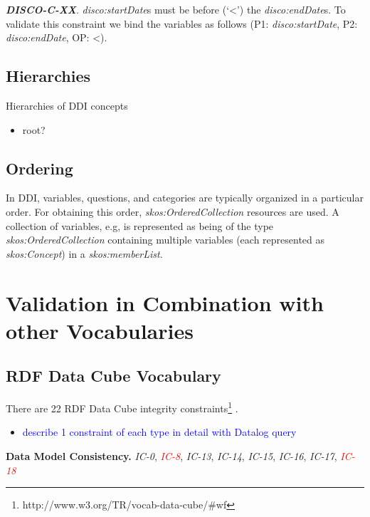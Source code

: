 \documentclass{elsart3p}    %
\begin{document}
\textbf{{\em DISCO-C-XX}}.
{\em disco:startDate}s must be before (‘\textless’) the {\em disco:endDate}s.
To validate this constraint we bind the variables as follows (P1: {\em disco:startDate}, P2: {\em disco:endDate}, OP: \textless). 

\subsection{Hierarchies}

Hierarchies of DDI concepts

\begin{itemize}
	\item root?
\end{itemize}

\subsection{Ordering}

In DDI, variables, questions, and categories are typically organized in a particular order. 
For obtaining this order, {\em skos:OrderedCollection} resources are used. 
A collection of variables, e.g, is represented as being of the type {\em skos:OrderedCollection} containing multiple variables (each represented as {\em skos:Concept}) in a {\em skos:memberList}. 

\section{Validation in Combination with other Vocabularies}

\subsection{RDF Data Cube Vocabulary}

There are 22 RDF Data Cube integrity constraints\footnote{http://www.w3.org/TR/vocab-data-cube/\#wf} \cite{CyganiakReynolds2014}.

\begin{itemize}
	\item \textcolor{blue}{describe 1 constraint of each type in detail with Datalog query}
\end{itemize}

\textbf{Data Model Consistency.}
{\em IC-0}, \textcolor{red}{{\em IC-8}}, {\em IC-13}, {\em IC-14}, {\em IC-15}, {\em IC-16}, {\em IC-17}, \textcolor{red}{{\em IC-18}}
\end{document}
